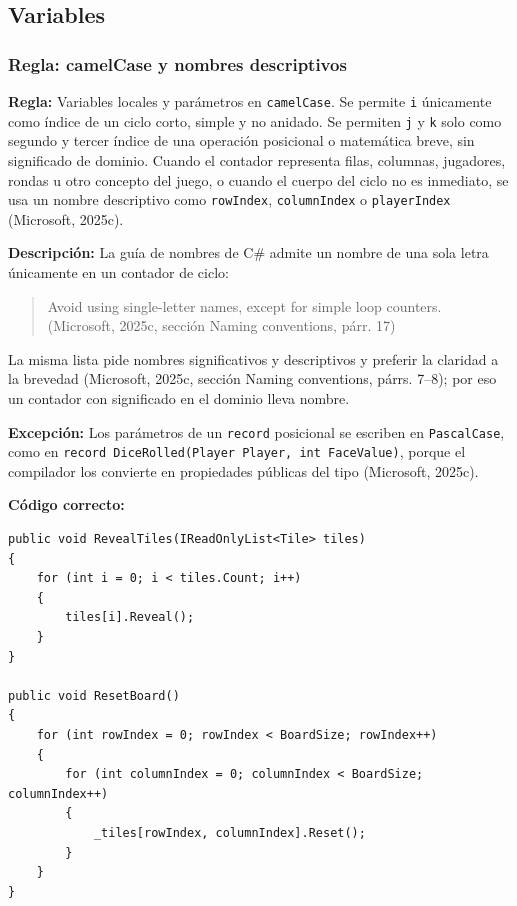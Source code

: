\subsection{Variables}

\subsubsection{Regla: camelCase y nombres descriptivos}

\textbf{Regla:} Variables locales y parámetros en \texttt{camelCase}. Se permite \texttt{i} únicamente como índice de un ciclo corto, simple y no anidado. Se permiten \texttt{j} y \texttt{k} solo como segundo y tercer índice de una operación posicional o matemática breve, sin significado de dominio. Cuando el contador representa filas, columnas, jugadores, rondas u otro concepto del juego, o cuando el cuerpo del ciclo no es inmediato, se usa un nombre descriptivo como \texttt{rowIndex}, \texttt{columnIndex} o \texttt{playerIndex} (Microsoft, 2025c).

\textbf{Descripción:} La guía de nombres de C\# admite un nombre de una sola letra únicamente en un contador de ciclo:
\begin{quote}
Avoid using single-letter names, except for simple loop counters. (Microsoft, 2025c, sección Naming conventions, párr. 17)
\end{quote}
\noindent La misma lista pide nombres significativos y descriptivos y preferir la claridad a la brevedad (Microsoft, 2025c, sección Naming conventions, párrs. 7--8); por eso un contador con significado en el dominio lleva nombre.

\textbf{Excepción:} Los parámetros de un \texttt{record} posicional se escriben en \texttt{PascalCase}, como en \texttt{record DiceRolled(Player Player, int FaceValue)}, porque el compilador los convierte en propiedades públicas del tipo (Microsoft, 2025c).

\textbf{Código correcto:}
\begin{lstlisting}[style=csharpstyle]
public void RevealTiles(IReadOnlyList<Tile> tiles)
{
    for (int i = 0; i < tiles.Count; i++)
    {
        tiles[i].Reveal();
    }
}

public void ResetBoard()
{
    for (int rowIndex = 0; rowIndex < BoardSize; rowIndex++)
    {
        for (int columnIndex = 0; columnIndex < BoardSize; columnIndex++)
        {
            _tiles[rowIndex, columnIndex].Reset();
        }
    }
}
\end{lstlisting}

